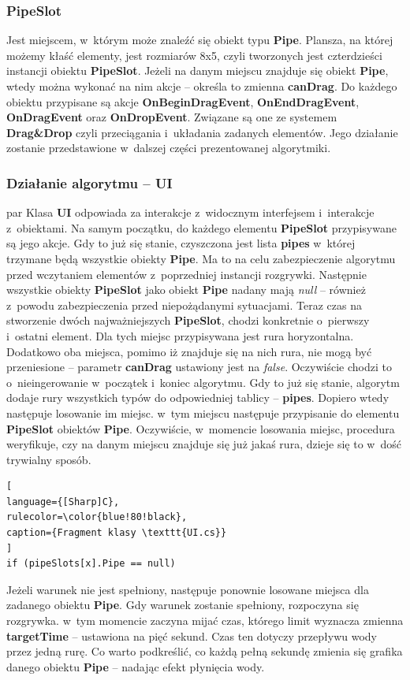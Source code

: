 \documentclass[oneside,polski,logo]{amuthesis}
\begin{document}
\subsubsection{PipeSlot}
\par Jest miejscem, w~którym może znaleźć się obiekt typu \textbf{Pipe}. Plansza, na której możemy kłaść elementy, jest rozmiarów 8x5, czyli tworzonych jest czterdzieści instancji obiektu \textbf{PipeSlot}. Jeżeli na danym miejscu znajduje się obiekt \textbf{Pipe}, wtedy można wykonać na nim akcje – określa to zmienna \textbf{canDrag}. Do każdego obiektu przypisane są akcje \textbf{OnBeginDragEvent}, \textbf{OnEndDragEvent}, \textbf{OnDragEvent} oraz \textbf{OnDropEvent}. Związane są one ze systemem \textbf{Drag\&Drop} czyli przeciągania i~układania zadanych elementów. Jego działanie zostanie przedstawione w~dalszej części prezentowanej algorytmiki.
\subsubsection{Działanie algorytmu – UI}
par Klasa \textbf{UI} odpowiada za interakcje z~widocznym interfejsem i~interakcje z~obiektami. Na samym początku, do każdego elementu \textbf{PipeSlot} przypisywane są jego akcje. Gdy to już się stanie, czyszczona jest lista \textbf{pipes} w~której trzymane będą wszystkie obiekty \textbf{Pipe}. Ma to na celu zabezpieczenie algorytmu przed wczytaniem elementów z~poprzedniej instancji rozgrywki. Następnie wszystkie obiekty \textbf{PipeSlot} jako obiekt \textbf{Pipe} nadany mają \emph{null} – również z~powodu zabezpieczenia przed niepożądanymi sytuacjami. Teraz czas na stworzenie dwóch najważniejszych \textbf{PipeSlot}, chodzi konkretnie o~pierwszy i~ostatni element. Dla tych miejsc przypisywana jest rura horyzontalna. Dodatkowo oba miejsca, pomimo iż znajduje się na nich rura, nie mogą być przeniesione – parametr \textbf{canDrag} ustawiony jest na \emph{false}. Oczywiście chodzi to o~nieingerowanie w~początek i~koniec algorytmu. Gdy to już się stanie, algorytm dodaje rury wszystkich typów do odpowiedniej tablicy – \textbf{pipes}. Dopiero wtedy następuje losowanie im miejsc. w~tym miejscu następuje przypisanie do elementu \textbf{PipeSlot} obiektów \textbf{Pipe}. Oczywiście, w~momencie losowania miejsc, procedura weryfikuje, czy na danym miejscu znajduje się już jakaś rura, dzieje się to w~dość trywialny sposób.

\begin{lstlisting}[
language={[Sharp]C},
rulecolor=\color{blue!80!black},
caption={Fragment klasy \texttt{UI.cs}}
]
if (pipeSlots[x].Pipe == null)
\end{lstlisting}
Jeżeli warunek nie jest spełniony, następuje ponownie losowane miejsca dla zadanego obiektu \textbf{Pipe}. Gdy warunek zostanie spełniony, rozpoczyna się rozgrywka. w~tym momencie zaczyna mijać czas, którego limit wyznacza zmienna \textbf{targetTime} – ustawiona na pięć sekund. Czas ten dotyczy przepływu wody przez jedną rurę. Co warto podkreślić, co każdą pełną sekundę zmienia się grafika danego obiektu \textbf{Pipe} – nadając efekt płynięcia wody.
\end{document}
